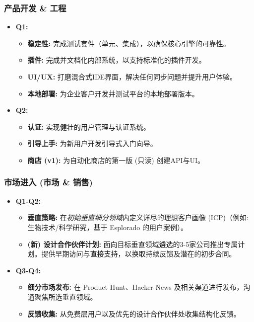 \documentclass[11pt, a4paper, oneside]{article}
\begin{document}
\subsubsection{产品开发 \& 工程}
\begin{itemize}[leftmargin=*]
    \item \textbf{Q1:}
    \begin{itemize}
        \item \textbf{稳定性:} 完成测试套件（单元、集成），以确保核心引擎的可靠性。
        \item \textbf{插件:} 完成并文档化内部系统，以支持标准化的插件开发。
        \item \textbf{UI/UX:} 打磨混合式IDE界面，解决任何同步问题并提升用户体验。
        \item \textbf{本地部署:} 为企业客户开发并测试平台的本地部署版本。
    \end{itemize}
    \item \textbf{Q2:}
    \begin{itemize}
        \item \textbf{认证:} 实现健壮的用户管理与认证系统。
        \item \textbf{引导上手:} 为新用户开发引导式入门向导。
        \item \textbf{商店 (v1):} 为自动化商店的第一版 (只读) 创建API与UI。
    \end{itemize}
\end{itemize}

\subsubsection{市场进入 (市场 \& 销售)}
\begin{itemize}[leftmargin=*]
    \item \textbf{Q1-Q2:}
    \begin{itemize}
        \item \textbf{垂直策略:} 在\textit{初始垂直细分领域}内定义详尽的理想客户画像 (ICP)（例如: 生物技术/科学研究，基于 Esplorado 的用户案例）。
        \item \textbf{(新) 设计合作伙伴计划:} 面向目标垂直领域遴选的3-5家公司推出专属计划。提供早期访问与直接支持，以换取持续反馈及潜在的初步合同。
    \end{itemize}
    \item \textbf{Q3-Q4:}
    \begin{itemize}
        \item \textbf{细分市场发布:} 在 Product Hunt、Hacker News 及相关渠道进行发布，沟通聚焦所选垂直领域。
        \item \textbf{反馈收集:} 从免费层用户以及优先的设计合作伙伴处收集结构化反馈。
    \end{itemize}
\end{itemize}
\end{document}
